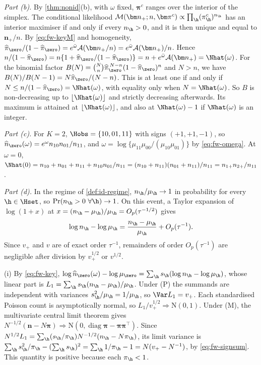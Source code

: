 \emph{Part (b).} By \cref{thm:nonid}(b), with $\omega$ fixed, $\bm\pi^c$ ranges over the interior of the simplex. The conditional likelihood $\mathcal M(\bm n_+;n,\bm\pi^c)\propto\prod_{\h}(\pi^c_{\h})^{n_{\h}}$ has an interior maximiser if and only if every $n_{\h}>0$, and it is then unique and equal to $\bm n_+/n$. By \eqref{eq:fw-keyM} and homogeneity, $\widehat\pi_{\zero}/(1-\widehat\pi_{\zero})=e^{\bar\omega}\mathcal A(\bm n_+/n)=e^{\bar\omega}\mathcal A(\bm n_+)/n$. Hence
$n/(1-\widehat\pi_{\zero})=n\{1+\widehat\pi_{\zero}/(1-\widehat\pi_{\zero})\}=n+e^{\bar\omega}\mathcal A(\bm n_+)=\Nhat(\omega)$.
For the binomial factor $B(N)=\binom{N}{n}\widehat\pi_{\zero}^{\,N-n}(1-\widehat\pi_{\zero})^n$ and $N>n$, we have $B(N)/B(N-1)=N\widehat\pi_{\zero}/(N-n)$. This is at least one if and only if $N\le n/(1-\widehat\pi_{\zero})=\Nhat(\omega)$, with equality only when $N=\Nhat(\omega)$. So $B$ is non-decreasing up to $\lfloor\Nhat(\omega)\rfloor$ and strictly decreasing afterwards. Its maximum is attained at $\lfloor\Nhat(\omega)\rfloor$, and also at $\Nhat(\omega)-1$ if $\Nhat(\omega)$ is an integer.

\emph{Part (c).} For $K=2$, $\Hobs=\{10,01,11\}$ with signs $(+1,+1,-1)$, so $\widehat n_{\zero}(\omega)=e^{\omega}n_{10}n_{01}/n_{11}$, and $\omega=\log\{\mu_{11}\mu_{00}/(\mu_{10}\mu_{01})\}$ by \eqref{eq:fw-omega}. At $\omega=0$,
$\Nhat(0)=n_{10}+n_{01}+n_{11}+n_{10}n_{01}/n_{11}=(n_{10}+n_{11})(n_{01}+n_{11})/n_{11}=n_{1+}n_{2+}/n_{11}$.

\emph{Part (d).} In the regime of \cref{def:id-regime}, $n_{\h}/\mu_{\h}\to1$ in probability for every $\h\in\Hset$, so $\Pr(n_{\h}>0\ \forall\h)\to1$. On this event, a Taylor expansion of $\log(1+x)$ at $x=(n_{\h}-\mu_{\h})/\mu_{\h}=O_p(\tau^{-1/2})$ gives
\begin{equation}\label{eq:id-app-lin}
  \log n_{\h}-\log\mu_{\h}=\frac{n_{\h}-\mu_{\h}}{\mu_{\h}}+O_p(\tau^{-1}).
\end{equation}
Since $v_+$ and $v$ are of exact order $\tau^{-1}$, remainders of order $O_p(\tau^{-1})$ are negligible after division by $v_+^{1/2}$ or $v^{1/2}$.

(i) By \eqref{eq:fw-key}, $\log\widehat n_{\zero}(\omega)-\log\mu_{\zero}=\sum_{\h}s_{\h}(\log n_{\h}-\log\mu_{\h})$, whose linear part is $L_1=\sum_{\h}s_{\h}(n_{\h}-\mu_{\h})/\mu_{\h}$. Under (P) the summands are independent with variances $s_{\h}^2/\mu_{\h}=1/\mu_{\h}$, so $\Var L_1=v_+$. Each standardised Poisson count is asymptotically normal, so $L_1/v_+^{1/2}\Rightarrow\mathrm N(0,1)$. Under (M), the multivariate central limit theorem gives $N^{-1/2}(\bm n-N\bm\pi)\Rightarrow\mathrm N(0,\operatorname{diag}\bm\pi-\bm\pi\bm\pi^{\top})$. Since $N^{1/2}L_1=\sum_{\h}(s_{\h}/\pi_{\h})N^{-1/2}(n_{\h}-N\pi_{\h})$, its limit variance is
$\sum_{\h}s_{\h}^2/\pi_{\h}-(\sum_{\h}s_{\h})^2=\sum_{\h}1/\pi_{\h}-1=N(v_+-N^{-1})$, by \eqref{eq:fw-signsum}. This quantity is positive because each $\pi_{\h}<1$.

